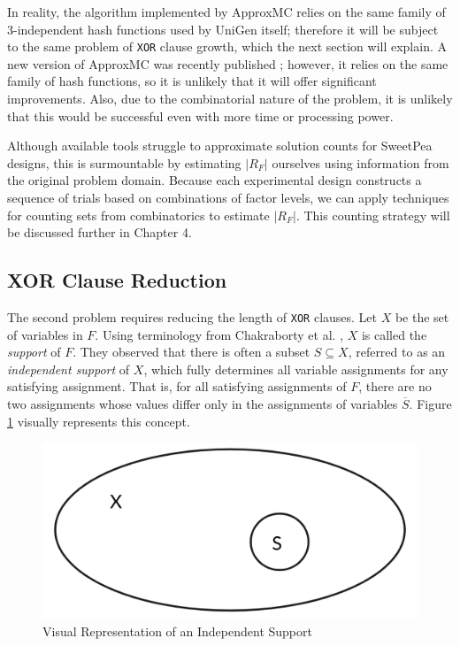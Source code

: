 In reality, the algorithm implemented by ApproxMC relies on the same family of 3-independent hash functions used by UniGen itself; therefore it will be subject to the same problem of \texttt{XOR} clause growth, which the next section will explain. A new version of ApproxMC was recently published \cite{approxmc_SM19}; however, it relies on the same family of hash functions, so it is unlikely that it will offer significant improvements. Also, due to the combinatorial nature of the problem, it is unlikely that this would be successful even with more time or processing power.

Although available tools struggle to approximate solution counts for SweetPea designs, this is surmountable by estimating $|R_F|$ ourselves using information from the original problem domain. Because each experimental design constructs a sequence of trials based on combinations of factor levels, we can apply techniques for counting sets from combinatorics to estimate $|R_F|$. This counting strategy will be discussed further in Chapter 4.

\subsection{XOR Clause Reduction}

The second problem requires reducing the length of \texttt{XOR} clauses. Let $X$ be the set of variables in $F$. Using terminology from Chakraborty et al. \cite{chakraborty_balancing_2014}, $X$ is called the \textit{support} of $F$. They observed that there is often a subset $S \subseteq X$, referred to as an \textit{independent support} of $X$, which fully determines all variable assignments for any satisfying assignment. That is, for all satisfying assignments of $F$, there are no two assignments whose values differ only in the assignments of variables $\overline{S}$. Figure \ref{fig:ind_support} visually represents this concept.

\begin{figure}[b]
\centering
\centerline{\includegraphics[origin=c,width=12cm]{../figures/independent-support.png}}
\caption{Visual Representation of an Independent Support}
\label{fig:ind_support}
\end{figure}


